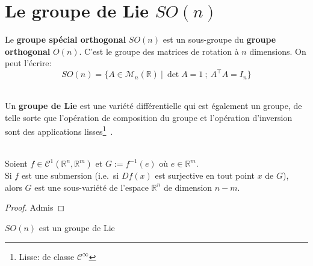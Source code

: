 \documentclass[12pt]{report}
\begin{document}
\section{\texorpdfstring{Le groupe de Lie $SO(n)$}{Le groupe de Lie SO (n)}}

Le \textbf{groupe spécial orthogonal} $SO(n)$ est un sous-groupe du \textbf{groupe orthogonal} $O(n)$. C'est le groupe des matrices de rotation à $n$ dimensions. On peut l'écrire:
\[
SO(n)=\{A\in \mathcal{M}_n(\mathbb{R})~|~\det{A}=1~;~A^{\top}A=I_n\}
\]

\begin{definition} \leavevmode\\
Un \textbf{groupe de Lie} est une variété différentielle qui est également un groupe, de telle sorte que l'opération de composition du groupe et l'opération d'inversion sont des applications lisses\footnote{Lisse: de classe $\mathcal{C}^{\infty}$}~\cite{Hol24}.
\end{definition}

\begin{theorem} \label{thm:submersion}\leavevmode\\
Soient $f\in \mathcal{C}^1(\mathbb{R}^n,\mathbb{R}^m)$ et $G := f^{-1}(e)$ où $e\in \mathbb{R}^m$.\\
Si $f$ est une submersion (i.e.~si $Df(x)$ est surjective en tout point $x$ de $G$), alors $G$ est une sous-variété de l'espace $\mathbb{R}^n$ de dimension $n-m$.
\end{theorem}

\begin{proof}
Admis
\end{proof}

\begin{proposition}\label{prop:SO-groupe-de-Lie}
$SO(n)$ est un groupe de Lie
\end{proposition}
\end{document}

